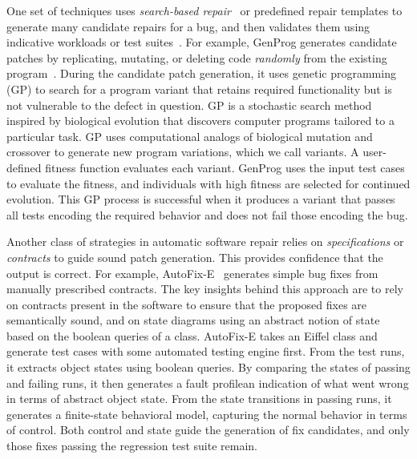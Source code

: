 One set of techniques uses {\em search-based repair}~\cite{harman07} or predefined repair templates to generate many candidate repairs for a bug, and then validates them using indicative workloads or test suites~\cite{Kim2013:PAR, genprog-icse2012, Perkins09:clearview}. For example, GenProg generates candidate patches by replicating, mutating, or deleting code \emph{randomly} from the existing program~\cite{genprog-icse2012}. During the candidate patch generation, it uses genetic programming (GP) to search for a program variant that retains required functionality but is not vulnerable to the defect in question. GP is a stochastic search method inspired by biological evolution that discovers computer programs tailored to a particular task. GP uses computational analogs of biological mutation and crossover to generate new program variations, which we call variants. A user-defined fitness function evaluates each variant. GenProg uses the input test cases to evaluate the fitness, and individuals with high fitness are selected for continued evolution. This GP process is successful when it produces a variant that passes all tests encoding the required behavior and does not fail those encoding the bug.


Another class of strategies in automatic software repair relies on {\em specifications} or {\em contracts} to guide sound patch generation. %
This provides confidence that the output is correct. For example, AutoFix-E~\cite{Wei:2010:AutoFix-E} generates simple bug fixes from manually prescribed contracts. The key insights behind this approach are to rely on contracts present in the software to ensure that the proposed fixes are semantically sound, and on state diagrams using an abstract notion of state based on the boolean queries of a class. AutoFix-E takes an Eiffel class and generate test cases with some automated testing engine first. From the test runs, it extracts object states using boolean queries. By comparing the states of passing and failing runs, it then generates a fault profile\textemdash an indication of what went wrong in terms of abstract object state. From the state transitions in passing runs, it generates a finite-state behavioral model, capturing the normal behavior in terms of control. Both control and state guide the generation of fix candidates, and only those fixes passing the regression test suite remain. 

